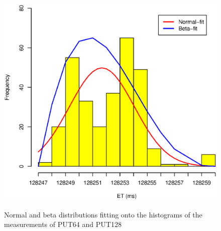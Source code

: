 \documentclass[10pt]{article}
\begin{document}
\begin{figure}
{		\includegraphics[scale=0.43]{figures/sodb12-ntp-on-turbo-off/128_sec_et_hist.eps}
		\label{fig:128_sec_et_hist1}
	}
	\caption{Normal and beta distributions fitting onto the histograms of the measurements of PUT64 and PUT128~\label{fig:extra_pt_hist4}}
\end{figure}
\end{document}

